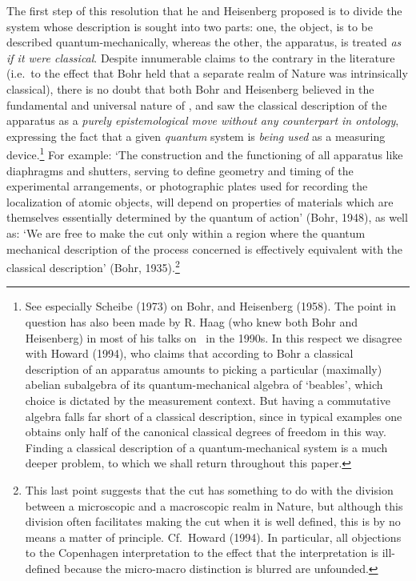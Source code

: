 \documentclass[12pt,titlepage]{article}
\begin{document}
 The first step of this  resolution that he and Heisenberg proposed is to divide the system whose description is sought into two parts: one, the object, is to be described quantum-mechanically, whereas the other, the apparatus, is treated \textit{as if it were classical}. 
Despite innumerable claims to the contrary in the literature  (i.e.\ to the effect that Bohr held that a separate realm of Nature was intrinsically classical), there is no doubt that
both Bohr and Heisenberg believed in the fundamental and universal nature of \qm, and 
saw the classical description of the apparatus as a {\it purely epistemological move without any counterpart in ontology},
expressing the fact that a given {\it quantum} system is {\it being used} as a measuring device.\footnote{See especially Scheibe (1973) on Bohr, and Heisenberg (1958). The point in question has also been made by R. Haag (who knew both Bohr and Heisenberg) in most of his talks on \qm\ in the 1990s.
In this respect we disagree with Howard (1994), who claims that according to Bohr a classical description of an apparatus amounts to picking a particular (maximally) abelian subalgebra of its quantum-mechanical algebra of `beables', which choice is dictated by the measurement context. But having a commutative algebra falls far short of a classical description, since in typical examples one obtains only half of the canonical classical degrees of freedom in this way. Finding a classical description of a 
 quantum-mechanical system is a much deeper problem, to which we shall return throughout this paper.} For example: `The construction and the functioning of all apparatus like diaphragms and shutters, serving to define geometry and timing of the experimental arrangements, or photographic plates used for recording the localization of atomic objects, will depend on properties of materials which are themselves essentially determined by the quantum of action' (Bohr, 1948), as well as: 
`We are free to make the cut only within a region where the quantum mechanical description of the process concerned is effectively equivalent with the classical description'
(Bohr, 1935).\footnote{This last point suggests that the cut has something to do with the division between a microscopic and a macroscopic realm in Nature, 
but although this division often facilitates making the cut when it is well defined, this is by no means a matter of principle. Cf.\ Howard (1994).
In particular, all objections to the Copenhagen interpretation to the effect
that the interpretation is ill-defined because the micro-macro distinction is blurred are unfounded. }
\end{document}
